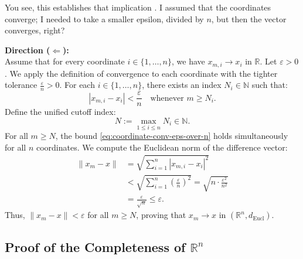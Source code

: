 \begin{proofWrapper}
\begin{speech}[01:12:27 - 01:14:32]
You see, this establishes that implication . I assumed that the coordinates converge; I needed to take a smaller epsilon, divided by $n$, but then the vector converges, right?
\end{speech}

\begin{content}
\textbf{Direction ($\Longleftarrow$):} \\
Assume that for every coordinate $i \in \{1, \dots, n\}$, we have $x_{m,i} \to x_i$ in $\mathbb{R}$.
Let $\varepsilon > 0$. We apply the definition of convergence to each coordinate with the tighter tolerance $\frac{\varepsilon}{n} > 0$. For each $i \in \{1, \dots, n\}$, there exists an index $N_i \in \mathbb{N}$ such that:
\begin{equation}\label{eq:coordinate-conv-eps-over-n}
|x_{m,i} - x_i| < \frac{\varepsilon}{n} \quad \text{whenever } m \ge N_i.
\end{equation}
Define the unified cutoff index:
\begin{equation}\label{eq:max-cutoff-index}
N := \max_{1 \le i \le n} N_i \in \mathbb{N}.
\end{equation}
For all $m \ge N$, the bound \eqref{eq:coordinate-conv-eps-over-n} holds simultaneously for all $n$ coordinates. We compute the Euclidean norm of the difference vector:
\begin{align}
\|x_m - x\| &= \sqrt{\sum_{i=1}^n |x_{m,i} - x_i|^2} \nonumber \\
&< \sqrt{\sum_{i=1}^n \left(\frac{\varepsilon}{n}\right)^2} = \sqrt{n \cdot \frac{\varepsilon^2}{n^2}} \nonumber \\
&= \frac{\varepsilon}{\sqrt{n}} \le \varepsilon. \label{eq:vector-norm-bound}
\end{align}
Thus, $\|x_m - x\| < \varepsilon$ for all $m \ge N$, proving that $x_m \to x$ in $(\mathbb{R}^n, d_{\text{Eucl}})$.
\end{content}

\end{proofWrapper}

\subsection{Proof of the Completeness of \texorpdfstring{$\mathbb{R}^n$}{R^n}}

